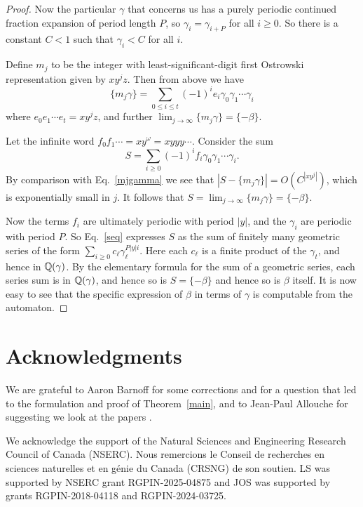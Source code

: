 \documentclass[12pt,reqno]{article}
\begin{document}
\begin{proof}
Now the particular $\gamma$ that concerns us has a purely periodic
continued fraction expansion of period length $P$, so
$\gamma_i = \gamma_{i+P}$ for all $i \geq 0$.  So there is a constant
$C<1$ such that $\gamma_i < C$ for all $i$.  

Define $m_j$ to be the integer with least-significant-digit first
Ostrowski representation
given by $x y^j z$.  Then from above we have
\begin{equation}
\{ m_j \gamma \} = \sum_{0 \leq i \leq t}
(-1)^i e_i \gamma_0 \gamma_1 \cdots \gamma_i 
\label{mjgamma}
\end{equation}
where $e_0 e_1 \cdots e_t = x y^j z$, and
further $\lim_{j \rightarrow \infty} \{ m_j \gamma \} = \{ -\beta \}$.

Let the infinite word $f_0 f_1 \cdots = xy^\omega = xyyy\cdots$.
Consider the sum
\begin{equation}
S = \sum_{i \geq 0}
(-1)^i f_i \gamma_0 \gamma_1 \cdots \gamma_i .
\label{seq}
\end{equation}
By comparison with Eq.~\eqref{mjgamma} we see that
$|S - \{ m_j \gamma \}| = O(C^{|xy^j|})$, which is exponentially
small in $j$.  It follows that
$S = \lim_{j \rightarrow \infty} \{ m_j \gamma \} = \{ -\beta \}$.

Now the terms $f_i$ are ultimately periodic with period $|y|$,
and the $\gamma_i$ are periodic with period $P$.  So 
Eq.~\eqref{seq} expresses $S$ as the sum of finitely many 
geometric series of the form $\sum_{i \geq 0}
c_{\ell} \gamma_\ell^{P|y|i}$. Here each $c_{\ell}$ is
a finite product of the $\gamma_t$, and hence in $\mathbb{Q}(\gamma)$.
By the elementary formula for the sum of a geometric series,
each series sum is in $\mathbb{Q}(\gamma)$, and hence so is $S = \{ -\beta \}$ and
hence so is $\beta$ itself.  It is now easy to see that
the specific expression of
$\beta$ in terms of $\gamma$ is computable from the automaton.
\end{proof}


\section*{Acknowledgments}

We are grateful to Aaron Barnoff for some corrections and for a question that led to the formulation and proof of Theorem~\ref{main}, and to Jean-Paul Allouche for suggesting we look at the papers \cite{Hildebrand&Li&Li&Xie:2019,Russo&Schwiebert:2011,Gunaydin&Ozsahakyan:2022}.

We acknowledge the support of the 
Natural Sciences and Engineering Research Council of Canada (NSERC).
Nous remercions le Conseil de recherches en sciences naturelles et en g\'enie du Canada (CRSNG) de son soutien.
LS was supported by NSERC grant
RGPIN-2025-04875 and
JOS was supported by grants RGPIN-2018-04118 and
RGPIN-2024-03725.
\end{document}
